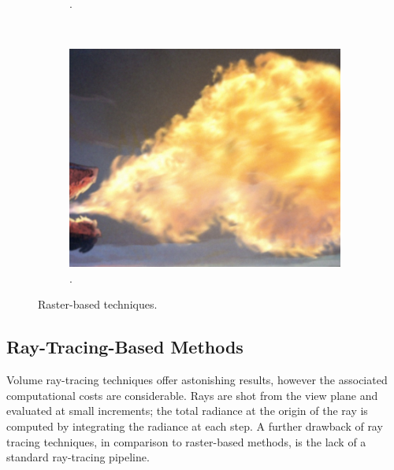 \begin{figure}[htpb!]
\begin{subfigure}[t]{0.285\textwidth}
                \caption{\cite{Zhao:2003}.}
        \end{subfigure}%
		~        
        \begin{subfigure}[t]{0.36\textwidth}
                \includegraphics[width=\textwidth]{img/jamriska_2015}
                \caption{\cite{Jamriska:2015}.}
        \end{subfigure}%
        \caption{Raster-based techniques.}
        \label{fig:raster_based}
\end{figure}



\subsection{Ray-Tracing-Based Methods}
\label{sec:ray_tracing_based}

Volume ray-tracing techniques offer astonishing results, however the associated computational costs are considerable.
Rays are shot from the view plane and evaluated at small increments; the total radiance at the origin of the ray is computed by integrating the radiance at each step.
A further drawback of ray tracing techniques, in comparison to raster-based methods, is the lack of a standard ray-tracing pipeline.


